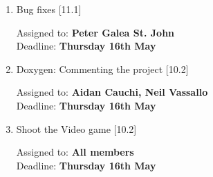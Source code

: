 \documentclass[11pt,a4paper]{article}
\begin{document}
\begin{enumerate}


\item Bug fixes [11.1]
\begin{flushright}
	Assigned to: \textbf{Peter Galea St. John} \\
	Deadline: \textbf{Thursday 16th May}
\end{flushright}

\item Doxygen: Commenting the project  [10.2]
\begin{flushright}
	Assigned to: \textbf{Aidan Cauchi, Neil Vassallo} \\
	Deadline: \textbf{Thursday 16th May}
\end{flushright}

\item Shoot the Video game [10.2]
\begin{flushright}
	Assigned to: \textbf{All members} \\
	Deadline: \textbf{Thursday 16th May}
\end{flushright}

\end{enumerate}	
\end{document}
